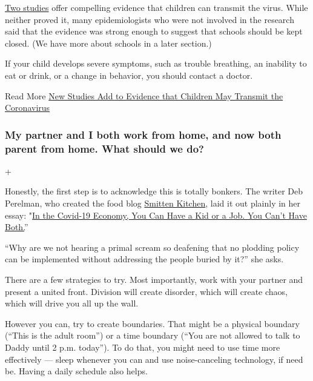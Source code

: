 \href{https://www.nytimes3xbfgragh.onion/2020/05/05/health/coronavirus-children-transmission-school.html}{Two
studies} offer compelling evidence that children can transmit the virus.
While neither proved it, many epidemiologists who were not involved in
the research said that the evidence was strong enough to suggest that
schools should be kept closed. (We have more about schools in a later
section.)

If your child develops severe symptoms, such as trouble breathing, an
inability to eat or drink, or a change in behavior, you should contact a
doctor.

Read More
\href{https://www.nytimes3xbfgragh.onion/2020/05/05/health/coronavirus-children-transmission-school.html}{New
Studies Add to Evidence that Children May Transmit the Coronavirus}

\hypertarget{my-partner-and-i-both-work-from-home-and-now-both-parent-from-home-what-should-we-do}{%
\subsubsection{My partner and I both work from home, and now both parent
from home. What should we
do?}\label{my-partner-and-i-both-work-from-home-and-now-both-parent-from-home-what-should-we-do}}

+

Honestly, the first step is to acknowledge this is totally bonkers. The
writer Deb Perelman, who created the food blog
\href{https://smittenkitchen.com/}{Smitten Kitchen}, laid it out plainly
in her essay:
"\href{https://www.nytimes3xbfgragh.onion/2020/07/02/business/covid-economy-parents-kids-career-homeschooling.html}{In
the Covid-19 Economy, You Can Have a Kid or a Job. You Can't Have
Both.}''

``Why are we not hearing a primal scream so deafening that no plodding
policy can be implemented without addressing the people buried by it?''
she asks.

There are a few strategies to try. Most importantly, work with your
partner and present a united front. Division will create disorder, which
will create chaos, which will drive you all up the wall.

However you can, try to create boundaries. That might be a physical
boundary (``This is the adult room'') or a time boundary (``You are not
allowed to talk to Daddy until 2 p.m. today''). To do that, you might
need to use time more effectively --- sleep whenever you can and use
noise-canceling technology, if need be. Having a daily schedule also
helps.


